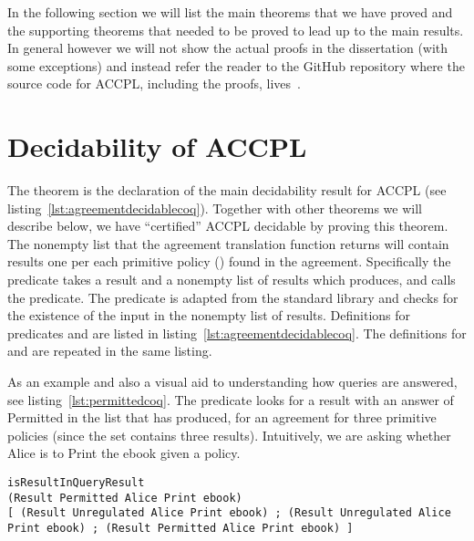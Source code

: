 In the following section we will list the main theorems that we have proved and the supporting theorems that needed to be proved to lead up to the main results. In general however we will not show the actual proofs in the dissertation (with some exceptions) and instead refer the reader to the GitHub repository where the source code for \ac{ACCPL}, including the proofs, lives~\cite{BahmanSistany2015}.

\section{Decidability of ACCPL}\label{sec:maintheorems}

The theorem  is the declaration of the main decidability result for \ac{ACCPL} (see listing~\ref{lst:agreementdecidablecoq}). Together with other theorems we will describe below, we have ``certified'' \ac{ACCPL} decidable by proving this theorem. The nonempty list that the agreement translation function  returns will contain results one per each primitive policy () found in the agreement. Specifically the predicate  takes a result and a nonempty list of results which  produces, and calls the  predicate. The  predicate is adapted from the  standard library and checks for the existence of the input  in the nonempty list of results. Definitions for predicates  and  are listed in listing~\ref{lst:agreementdecidablecoq}. The definitions for  and  are repeated in the same listing. 

As an example and also a visual aid to understanding how queries are answered, see listing~\ref{lst:permittedcoq}. The  predicate looks for a result with an answer of Permitted in the list that  has produced, for an agreement for three primitive policies (since the set contains three results). Intuitively, we are asking whether Alice is  to Print the ebook given a policy.  

\begin{lstlisting}
isResultInQueryResult
(Result Permitted Alice Print ebook) 
[ (Result Unregulated Alice Print ebook) ; (Result Unregulated Alice Print ebook) ; (Result Permitted Alice Print ebook) ]
\end{lstlisting}
    
